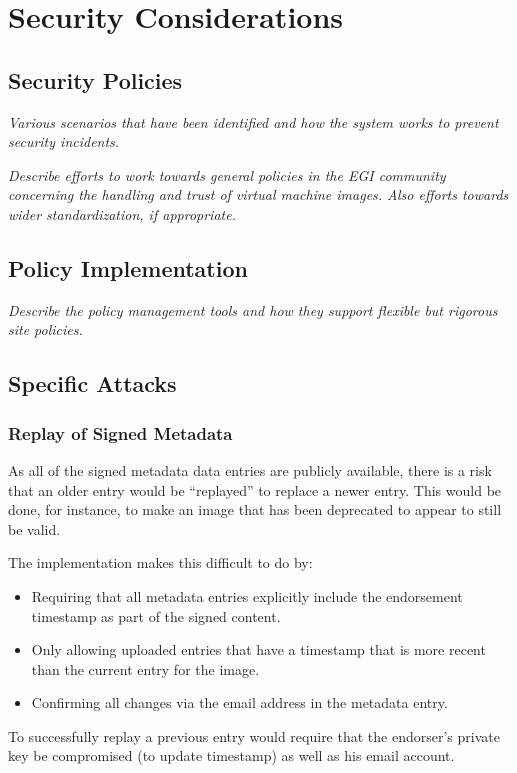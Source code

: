 \section{Security Considerations}
\label{sec:security}

\subsection{Security Policies}

{\em Various scenarios that have been identified and how the system
  works to prevent security incidents.}

{\em Describe efforts to work towards general policies in the EGI
  community concerning the handling and trust of virtual machine
  images.  Also efforts towards wider standardization, if
  appropriate.}

\subsection{Policy Implementation}

{\em Describe the policy management tools and how they support
  flexible but rigorous site policies.}

\subsection{Specific Attacks}

\subsubsection{Replay of Signed Metadata}

As all of the signed metadata data entries are publicly available,
there is a risk that an older entry would be ``replayed'' to replace a
newer entry.  This would be done, for instance, to make an image that
has been deprecated to appear to still be valid.

The implementation makes this difficult to do by:
\begin{itemize}
\item Requiring that all metadata entries explicitly include the
  endorsement timestamp as part of the signed content.
\item Only allowing uploaded entries that have a timestamp that is 
  more recent than the current entry for the image.
\item Confirming all changes via the email address in the metadata
  entry.
\end{itemize}
To successfully replay a previous entry would require that the
endorser's private key be compromised (to update timestamp) as well as
his email account.


